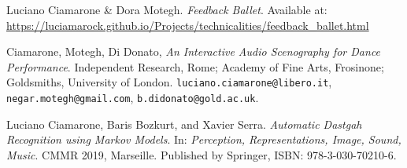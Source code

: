 \documentclass{article}
\begin{document}
\newpage
\begin{thebibliography}{References}
	Luciano Ciamarone \& Dora Motegh. 
	\textit{Feedback Ballet}.  
	Available at: \url{https://luciamarock.github.io/Projects/technicalities/feedback_ballet.html}  	
	
	Ciamarone, Motegh, Di Donato,
	\textit{An Interactive Audio Scenography for Dance Performance}.  
	Independent Research, Rome; Academy of Fine Arts, Frosinone; Goldsmiths, University of London.  
	\texttt{luciano.ciamarone@libero.it}, \texttt{negar.motegh@gmail.com}, \texttt{b.didonato@gold.ac.uk}.
	
	Luciano Ciamarone, Baris Bozkurt, and Xavier Serra. 
	\textit{Automatic Dastgah Recognition using Markov Models}. 
	In: \textit{Perception, Representations, Image, Sound, Music}. 
	CMMR 2019, Marseille. Published by Springer, ISBN: 978-3-030-70210-6.
	
\end{thebibliography}
\end{document}
